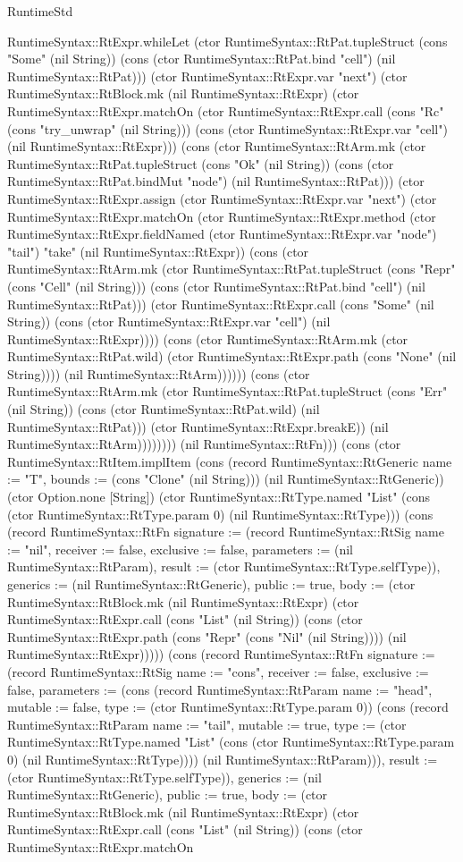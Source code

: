 \begin{lexlean}{RuntimeStd}
\begin{semanticmodule}
{RuntimeSyntax::RtExpr.whileLet (ctor RuntimeSyntax::RtPat.tupleStruct (cons "Some" (nil String)) (cons (ctor RuntimeSyntax::RtPat.bind "cell") (nil RuntimeSyntax::RtPat))) (ctor RuntimeSyntax::RtExpr.var "next") (ctor RuntimeSyntax::RtBlock.mk (nil RuntimeSyntax::RtExpr) (ctor RuntimeSyntax::RtExpr.matchOn (ctor RuntimeSyntax::RtExpr.call (cons "Rc" (cons "try_unwrap" (nil String))) (cons (ctor RuntimeSyntax::RtExpr.var "cell") (nil RuntimeSyntax::RtExpr))) (cons (ctor RuntimeSyntax::RtArm.mk (ctor RuntimeSyntax::RtPat.tupleStruct (cons "Ok" (nil String)) (cons (ctor RuntimeSyntax::RtPat.bindMut "node") (nil RuntimeSyntax::RtPat))) (ctor RuntimeSyntax::RtExpr.assign (ctor RuntimeSyntax::RtExpr.var "next") (ctor RuntimeSyntax::RtExpr.matchOn (ctor RuntimeSyntax::RtExpr.method (ctor RuntimeSyntax::RtExpr.fieldNamed (ctor RuntimeSyntax::RtExpr.var "node") "tail") "take" (nil RuntimeSyntax::RtExpr)) (cons (ctor RuntimeSyntax::RtArm.mk (ctor RuntimeSyntax::RtPat.tupleStruct (cons "Repr" (cons "Cell" (nil String))) (cons (ctor RuntimeSyntax::RtPat.bind "cell") (nil RuntimeSyntax::RtPat))) (ctor RuntimeSyntax::RtExpr.call (cons "Some" (nil String)) (cons (ctor RuntimeSyntax::RtExpr.var "cell") (nil RuntimeSyntax::RtExpr)))) (cons (ctor RuntimeSyntax::RtArm.mk (ctor RuntimeSyntax::RtPat.wild) (ctor RuntimeSyntax::RtExpr.path (cons "None" (nil String)))) (nil RuntimeSyntax::RtArm)))))) (cons (ctor RuntimeSyntax::RtArm.mk (ctor RuntimeSyntax::RtPat.tupleStruct (cons "Err" (nil String)) (cons (ctor RuntimeSyntax::RtPat.wild) (nil RuntimeSyntax::RtPat))) (ctor RuntimeSyntax::RtExpr.breakE)) (nil RuntimeSyntax::RtArm)))))))}) (nil RuntimeSyntax::RtFn))) (cons (ctor RuntimeSyntax::RtItem.implItem (cons (record RuntimeSyntax::RtGeneric {name := "T", bounds := (cons "Clone" (nil String))}) (nil RuntimeSyntax::RtGeneric)) (ctor Option.none [String]) (ctor RuntimeSyntax::RtType.named "List" (cons (ctor RuntimeSyntax::RtType.param 0) (nil RuntimeSyntax::RtType))) (cons (record RuntimeSyntax::RtFn {signature := (record RuntimeSyntax::RtSig {name := "nil", receiver := false, exclusive := false, parameters := (nil RuntimeSyntax::RtParam), result := (ctor RuntimeSyntax::RtType.selfType)}), generics := (nil RuntimeSyntax::RtGeneric), public := true, body := (ctor RuntimeSyntax::RtBlock.mk (nil RuntimeSyntax::RtExpr) (ctor RuntimeSyntax::RtExpr.call (cons "List" (nil String)) (cons (ctor RuntimeSyntax::RtExpr.path (cons "Repr" (cons "Nil" (nil String)))) (nil RuntimeSyntax::RtExpr))))}) (cons (record RuntimeSyntax::RtFn {signature := (record RuntimeSyntax::RtSig {name := "cons", receiver := false, exclusive := false, parameters := (cons (record RuntimeSyntax::RtParam {name := "head", mutable := false, type := (ctor RuntimeSyntax::RtType.param 0)}) (cons (record RuntimeSyntax::RtParam {name := "tail", mutable := true, type := (ctor RuntimeSyntax::RtType.named "List" (cons (ctor RuntimeSyntax::RtType.param 0) (nil RuntimeSyntax::RtType)))}) (nil RuntimeSyntax::RtParam))), result := (ctor RuntimeSyntax::RtType.selfType)}), generics := (nil RuntimeSyntax::RtGeneric), public := true, body := (ctor RuntimeSyntax::RtBlock.mk (nil RuntimeSyntax::RtExpr) (ctor RuntimeSyntax::RtExpr.call (cons "List" (nil String)) (cons (ctor RuntimeSyntax::RtExpr.matchOn }
\end{semanticmodule}
\end{lexlean}
